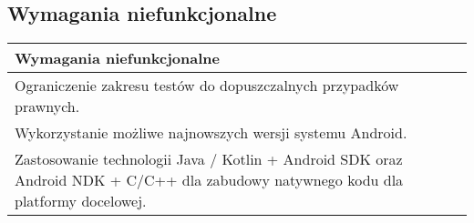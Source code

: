 \subsection{Wymagania niefunkcjonalne}
\begin{tabular}{|p{12cm}|}
\hline
    \textbf{Wymagania niefunkcjonalne} \\ 
\hline
    Ograniczenie zakresu testów do dopuszczalnych przypadków prawnych. \\
\hline
    Wykorzystanie możliwe najnowszych wersji systemu Android. \\
\hline
    Zastosowanie technologii Java / Kotlin + Android SDK oraz Android NDK + C/C++ dla zabudowy natywnego kodu dla
    platformy docelowej. \\
\hline
\end{tabular}
